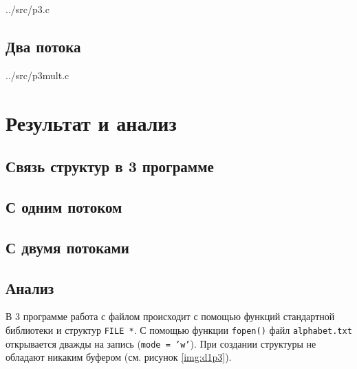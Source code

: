 \begin{lstinputlisting}[
        style=cstyle,
        caption={Третья программа с одним потоком},
        label={lst:3}
    ]{../src/p3.c}
\end{lstinputlisting}

\subsection{Два потока}

\begin{lstinputlisting}[
        style=cstyle,
        caption={Третья программа с двумя потоками},
        label={lst:3mult}
    ]{../src/p3mult.c}
\end{lstinputlisting}

\clearpage
\section{Результат и анализ}

\subsection{Связь структур в 3 программе}


\subsection{С одним потоком}


\subsection{С двумя потоками}


\subsection{Анализ}

В 3 программе работа с файлом происходит с помощью функций стандартной библиотеки и структур \texttt{FILE *}. С помощью функции \texttt{fopen()} файл \texttt{alphabet.txt} открывается дважды на запись (\texttt{mode = 'w'}). При создании структуры не обладают никаким буфером (см. рисунок \ref{img:d1p3}). 

